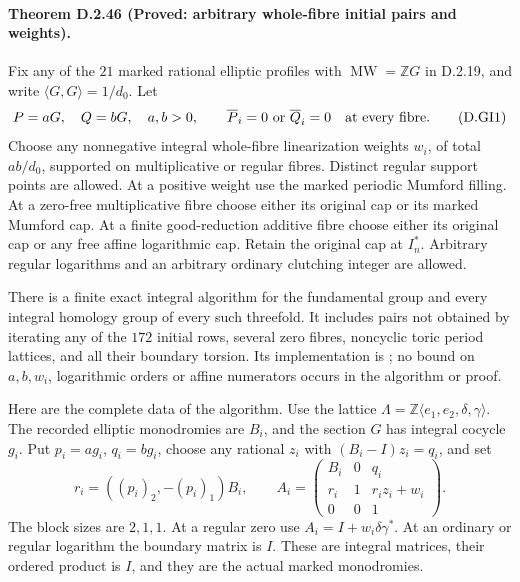 \paragraph{Theorem D.2.46 (Proved: arbitrary whole-fibre initial pairs and weights).}
Fix any of the $21$ marked rational elliptic profiles with
$\operatorname{MW}=\mathbb ZG$ in D.2.19, and write
$\langle G,G\rangle=1/d_0$. Let
\[
 P=aG,\quad Q=bG,\quad a,b>0,
 \qquad \overline P_i=0\ \hbox{or}\ \overline Q_i=0
                         \quad\hbox{at every fibre}.       \tag{D.GI1}
\]
Choose any nonnegative integral whole-fibre linearization
weights $w_i$, of total $ab/d_0$, supported on multiplicative
or regular fibres. Distinct regular support points are allowed.
At a positive weight use the marked periodic Mumford filling.
At a zero-free multiplicative fibre choose either its original
cap or its marked Mumford cap. At a finite good-reduction
additive fibre choose either its original cap or any free affine
logarithmic cap. Retain the original cap at $I_n^*$.
Arbitrary regular logarithms and an arbitrary ordinary clutching
integer are allowed.

There is a finite exact integral algorithm for the fundamental
group and every integral homology group of every such threefold.
It includes pairs not obtained by iterating any of the $172$
initial rows, several zero fibres, noncyclic toric period
lattices, and all their boundary torsion. Its implementation is
; no bound on
$a,b,w_i$, logarithmic orders or affine numerators occurs in the
algorithm or proof.

Here are the complete data of the algorithm. Use the lattice
$\Lambda=\mathbb Z\langle e_1,e_2,\delta,\gamma\rangle$.
The recorded elliptic monodromies are $B_i$, and the section
$G$ has integral cocycle $g_i$. Put $p_i=ag_i$, $q_i=bg_i$,
choose any rational $z_i$ with $(B_i-I)z_i=q_i$, and set
\[
 r_i=((p_i)_2,-(p_i)_1)B_i,\qquad
 A_i=\begin{pmatrix}
 B_i&0&q_i\\ r_i&1&r_i z_i+w_i\\0&0&1
 \end{pmatrix}.                                           \tag{D.GI2}
\]
The block sizes are $2,1,1$. At a regular zero use
$A_i=I+w_i\delta\gamma^*$. At an ordinary or regular
logarithm the boundary matrix is $I$. These are integral
matrices, their ordered product is $I$, and they are the
actual marked monodromies.

